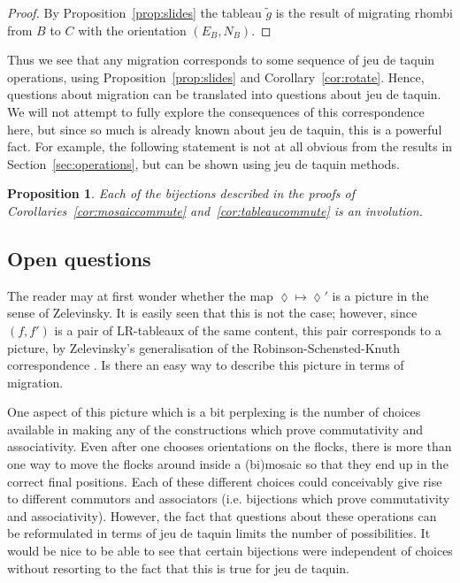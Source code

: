 \documentclass[12pt]{article}
\newtheorem{proposition}[lemma]{Proposition}
\begin{document}
\begin{proof}
By Proposition~\ref{prop:slides} the tableau $\tilde g$ is the result of 
migrating rhombi from $B$ to $C$ with the orientation $(E_B, N_B)$.
\end{proof}

Thus we see that any migration corresponds to some sequence 
of jeu de taquin operations, using Proposition~\ref{prop:slides}
and Corollary~\ref{cor:rotate}.  Hence, questions about migration can 
be translated into questions about jeu de taquin.  We will not attempt
to fully explore the consequences of this correspondence here, but since
so much is already known about jeu de taquin, this is a powerful fact.
For example, the following statement is not at all obvious from the
results in Section~\ref{sec:operations}, but can be shown using jeu
de taquin methods.

\begin{proposition}
\label{prop:involutions}
Each of the bijections described in the proofs of 
Corollaries~\ref{cor:mosaiccommute} and~\ref{cor:tableaucommute} 
is an involution.
\end{proposition}


\subsection{Open questions}
\label{sec:questions}
The reader may at first wonder whether the map 
$\lozenge \mapsto \lozenge'$
is a picture in the sense of Zelevinsky.  It is easily seen that this
is not the case; however, 
since $(f,f')$ is a pair of LR-tableaux of the same content, this
pair corresponds to a picture,
by Zelevinsky's generalisation of the Robinson-Schensted-Knuth
correspondence \cite{zelevinsky}.  Is there
an easy way to describe this picture in terms of migration.

One aspect of this picture which is a bit perplexing is the number
of choices available in making any of the constructions which
prove commutativity and associativity.  Even after one chooses orientations 
on the flocks, there is more than one way to move the flocks around
inside a (bi)mosaic so that they end up in the correct final positions.
Each of these different choices could conceivably give rise to
different commutors and associators (i.e. bijections which prove
commutativity and associativity).  However, the fact that questions
about these operations can be reformulated in terms of jeu de taquin 
limits the number of possibilities.  It would be nice to be able to
see that certain bijections were independent of choices without
resorting to the fact that this is true for jeu de taquin.
\end{document}
